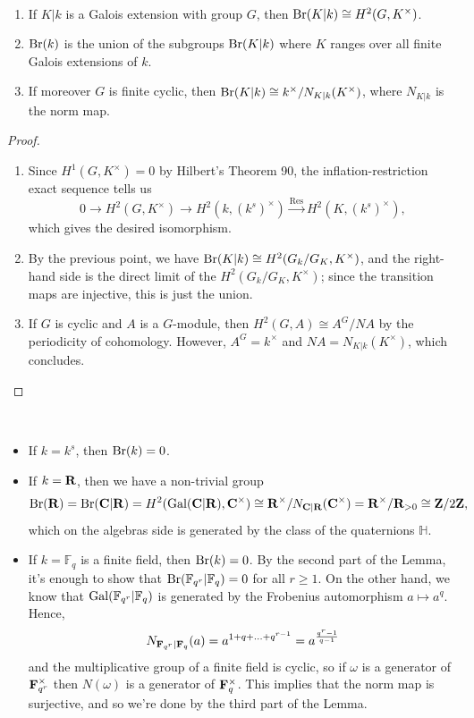 \documentclass{article}
\begin{document}
\begin{lem}\
		\begin{enumerate}
				\item If $K|k$ is a Galois extension with group $G$, then $\text{Br}(K|k) \cong H^2(G,K^\times)$.
				\item $\text{Br}(k)$ is the union of the subgroups $\text{Br}(K|k)$ where $K$ ranges over all finite Galois extensions of $k$.
				\item If moreover $G$ is finite cyclic, then $\text{Br}(K|k)\cong k^\times/N_{K|k}(K^\times)$, where $N_{K|k}$ is the norm map.
		\end{enumerate}
\end{lem}
\begin{proof}\
		\begin{enumerate}
				\item Since $H^1(G,K^\times)=0$ by Hilbert's Theorem 90, the inflation-restriction exact sequence tells us
				\[
					0\to H^2(G,K^\times)\to H^2(k,(k^s)^\times)\xrightarrow{\operatorname{Res}} H^2(K,(k^s)^\times),
				\]
				which gives the desired isomorphism.
				\item By the previous point, we have $\text{Br}(K|k) \cong H^2(G_k/G_K,K^\times)$, and the right-hand side is the direct limit of the $H^2(G_k/G_K,K^\times)$; since the transition maps are injective, this is just the union.
				\item If $G$ is cyclic and $A$ is a $G$-module, then $H^2(G,A) \cong A^G/NA$ by the periodicity of cohomology. However, $A^G = k^\times$ and $NA = N_{K|k}(K^\times)$, which concludes.
		\end{enumerate}
\end{proof}
\begin{exmp}\
		\begin{itemize}
				\item If $k=k^s$, then $\text{Br}(k)=0$.
				\item If $k=\mathbf{R}$, then we have a non-trivial group $$\text{Br}(\mathbf{R})= \text{Br}(\mathbf{C}|\mathbf{R}) = H^2(\operatorname{Gal}(\mathbf{C}|\mathbf{R}),\mathbf{C}^\times) \cong \mathbf{R}^\times/N_{\mathbf{C}|\mathbf{R}}(\mathbf{C}^\times) =\mathbf{R}^\times/\mathbf{R}_{>0} \cong \mathbf{Z}/2\mathbf{Z},$$ which on the algebras side is generated by the class of the quaternions $\mathbb{H}$.
				\item If $k=\mathbb{F}_q$ is a finite field, then $\text{Br}(k)=0$. By the second part of the Lemma, it's enough to show that $\text{Br}(\mathbb{F}_{q^r}|\mathbb{F}_q)=0$ for all $r\ge 1$. On the other hand, we know that $\operatorname{Gal}(\mathbb{F}_{q^r}|\mathbb{F}_q)$ is generated by the Frobenius automorphism $a\mapsto a^q$. Hence, $$N_{\mathbf{F}_{q^r}|\mathbf{F}_q}(a)=a^{1+q+\ldots+q^{r-1}}=a^{\frac{q^r-1}{q-1}}$$ and the multiplicative group of a finite field is cyclic, so if $\omega$ is a generator of $\mathbf{F}_{q^r}^\times$ then $N(\omega)$ is a generator of $\mathbf{F}_q^\times$. This implies that the norm map is surjective, and so we're done by the third part of the Lemma.
		\end{itemize}
\end{exmp}
\end{document}
